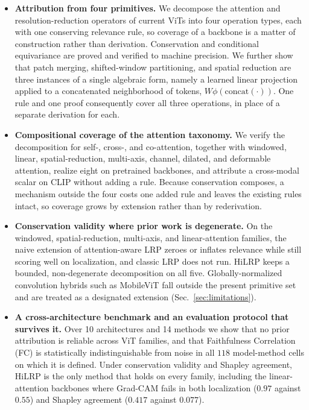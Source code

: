 \documentclass[lettersize,journal]{IEEEtran}
\theoremstyle{definition}
\theoremstyle{plain}
\begin{document}
\begin{itemize}[leftmargin=1.2em]
  \item \textbf{Attribution from four primitives.} We decompose the attention and resolution-reduction operators of current ViTs into four operation types, each with one conserving relevance rule, so coverage of a backbone is a matter of construction rather than derivation. Conservation and conditional equivariance are proved and verified to machine precision. We further show that patch merging, shifted-window partitioning, and spatial reduction are three instances of a single algebraic form, namely a learned linear projection applied to a concatenated neighborhood of tokens, $W\phi(\mathrm{concat}(\cdot))$. One rule and one proof consequently cover all three operations, in place of a separate derivation for each.

  \item \textbf{Compositional coverage of the attention taxonomy.} We verify the decomposition for self-, cross-, and co-attention, together with windowed, linear, spatial-reduction, multi-axis, channel, dilated, and deformable attention, realize eight on pretrained backbones, and attribute a cross-modal scalar on CLIP without adding a rule. Because conservation composes, a mechanism outside the four costs one added rule and leaves the existing rules intact, so coverage grows by extension rather than by rederivation.

  \item \textbf{Conservation validity where prior work is degenerate.} On the windowed, spatial-reduction, multi-axis, and linear-attention families, the naive extension of attention-aware LRP zeroes or inflates relevance while still scoring well on localization, and classic LRP does not run. HiLRP keeps a bounded, non-degenerate decomposition on all five. Globally-normalized convolution hybrids such as MobileViT fall outside the present primitive set and are treated as a designated extension (Sec.~\ref{sec:limitations}).

  \item \textbf{A cross-architecture benchmark and an evaluation protocol that survives it.} Over 10 architectures and 14 methods we show that no prior attribution is reliable across ViT families, and that Faithfulness Correlation (FC) is statistically indistinguishable from noise in all $118$ model-method cells on which it is defined. Under conservation validity and Shapley agreement, HiLRP is the only method that holds on every family, including the linear-attention backbones where Grad-CAM fails in both localization ($0.97$ against $0.55$) and Shapley agreement ($0.417$ against $0.077$).
\end{itemize}
\end{document}
